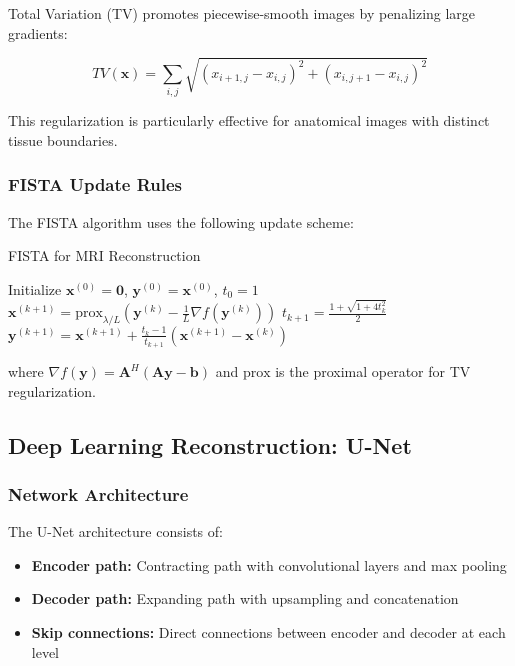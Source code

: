 \documentclass[11pt,a4paper]{article}
\begin{document}
Total Variation (TV) promotes piecewise-smooth images by penalizing large gradients:

\begin{equation}
TV(\mathbf{x}) = \sum_{i,j} \sqrt{(x_{i+1,j} - x_{i,j})^2 + (x_{i,j+1} - x_{i,j})^2}
\end{equation}

This regularization is particularly effective for anatomical images with distinct tissue boundaries.

\subsubsection{FISTA Update Rules}

The FISTA algorithm uses the following update scheme:

\begin{algorithm}[H]
\caption{FISTA for MRI Reconstruction}
\begin{algorithmic}
\STATE Initialize $\mathbf{x}^{(0)} = \mathbf{0}$, $\mathbf{y}^{(0)} = \mathbf{x}^{(0)}$, $t_0 = 1$
    \STATE $\mathbf{x}^{(k+1)} = \text{prox}_{\lambda/L} \left(\mathbf{y}^{(k)} - \frac{1}{L}\nabla f(\mathbf{y}^{(k)})\right)$
    \STATE $t_{k+1} = \frac{1 + \sqrt{1 + 4t_k^2}}{2}$
    \STATE $\mathbf{y}^{(k+1)} = \mathbf{x}^{(k+1)} + \frac{t_k - 1}{t_{k+1}}(\mathbf{x}^{(k+1)} - \mathbf{x}^{(k)})$
\ENDFOR
\end{algorithmic}
\end{algorithm}

where $\nabla f(\mathbf{y}) = \mathbf{A}^H(\mathbf{A}\mathbf{y} - \mathbf{b})$ and $\text{prox}$ is the proximal operator for TV regularization.

\subsection{Deep Learning Reconstruction: U-Net}

\subsubsection{Network Architecture}

The U-Net architecture consists of:
\begin{itemize}
    \item \textbf{Encoder path:} Contracting path with convolutional layers and max pooling
    \item \textbf{Decoder path:} Expanding path with upsampling and concatenation
    \item \textbf{Skip connections:} Direct connections between encoder and decoder at each level
\end{itemize}
\end{document}

